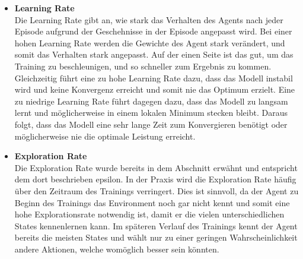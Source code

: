\begin{itemize}
    \item \textbf{Learning Rate}\\
    Die Learning Rate gibt an, wie stark das Verhalten des Agents nach jeder Episode aufgrund der Geschehnisse in der Episode angepasst wird. Bei einer hohen Learning Rate werden die Gewichte des Agent stark verändert, und somit das Verhalten stark angepasst. Auf der einen Seite ist das gut, um das Training zu beschleunigen, und so schneller zum Ergebnis zu kommen. Gleichzeitig führt eine zu hohe Learning Rate dazu, dass das Modell instabil wird und keine Konvergenz erreicht und somit nie das Optimum erzielt. Eine zu niedrige Learning Rate führt dagegen dazu, dass das Modell zu langsam lernt und möglicherweise in einem lokalen Minimum stecken bleibt. Daraus folgt, dass das Modell eine sehr lange Zeit zum Konvergieren benötigt oder möglicherweise nie die optimale Leistung erreicht. 

    \item \textbf{Exploration Rate }\\
    Die Exploration Rate  wurde bereits in dem Abschnitt  erwähnt und entspricht dem dort beschrieben epsilon. 
    In der Praxis wird die Exploration Rate häufig über den Zeitraum des Trainings verringert. Dies ist sinnvoll, da der Agent zu Beginn des Trainings das Environment noch gar nicht kennt und somit eine hohe Explorationsrate notwendig ist, damit er die vielen unterschiedlichen States kennenlernen kann. Im späteren Verlauf des Trainings kennt der Agent bereits die meisten States und wählt nur zu einer geringen Wahrscheinlichkeit andere Aktionen, welche womöglich besser sein könnten.

\end{itemize}